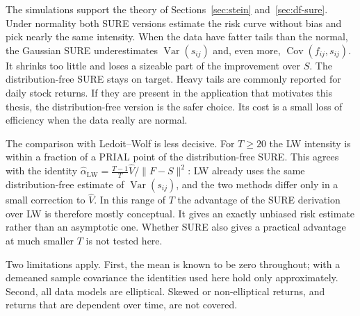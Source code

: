The simulations support the theory of Sections~\ref{sec:stein} and~\ref{sec:df-sure}. Under normality both SURE versions estimate the risk curve without bias and pick nearly the same intensity. When the data have fatter tails than the normal, the Gaussian SURE underestimates $\operatorname{Var}(s_{ij})$ and, even more, $\operatorname{Cov}(f_{ij}, s_{ij})$. It shrinks too little and loses a sizeable part of the improvement over $S$. The distribution-free SURE stays on target. Heavy tails are commonly reported for daily stock returns. If they are present in the application that motivates this thesis, the distribution-free version is the safer choice. Its cost is a small loss of efficiency when the data really are normal.

The comparison with Ledoit--Wolf is less decisive. For $T \ge 20$ the LW intensity is within a fraction of a PRIAL point of the distribution-free SURE. This agrees with the identity $\hat\alpha_{\mathrm{LW}} = \frac{T-1}{T}\hat V/\|F - S\|^2$: LW already uses the same distribution-free estimate of $\operatorname{Var}(s_{ij})$, and the two methods differ only in a small correction to $\hat V$. In this range of $T$ the advantage of the SURE derivation over LW is therefore mostly conceptual. It gives an exactly unbiased risk estimate rather than an asymptotic one. Whether SURE also gives a practical advantage at much smaller $T$ is not tested here.

Two limitations apply. First, the mean is known to be zero throughout; with a demeaned sample covariance the identities used here hold only approximately. Second, all data models are elliptical. Skewed or non-elliptical returns, and returns that are dependent over time, are not covered.
